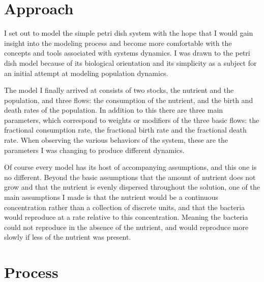 \documentclass[12pt]{article}
\begin{document}
\maketitle

\section{Approach}

I set out to model the simple petri dish system with the hope that I would gain insight into the modeling process and become more comfortable with the concepts and tools associated with systems dynamics.  I was drawn to the petri dish model because of its biological orientation and its simplicity as a subject for an initial attempt at modeling population dynamics.  

The model I finally arrived at consists of two stocks, the nutrient and the population, and three flows:  the consumption of the nutrient, and the birth and death rates of the population.  In addition to this there are three main parameters, which correspond to weights or modifiers of the three basic flows:  the fractional consumption rate, the fractional birth rate and the fractional death rate.  When observing the various behaviors of the system, these are the parameters I was changing to produce different dynamics.  

Of course every model has its host of accompanying assumptions, and this one is no different.  Beyond the basic assumptions that the amount of nutrient does not grow and that the nutrient is evenly dispersed throughout the solution, one of the main assumptions I made is that the nutrient would be a continuous concentration rather than a collection of discrete units, and that the bacteria would reproduce at a rate relative to this concentration.  Meaning the bacteria could not reproduce in the absence of the nutrient, and would reproduce more slowly if less of the nutrient was present.   

\section{Process}
\end{document}
